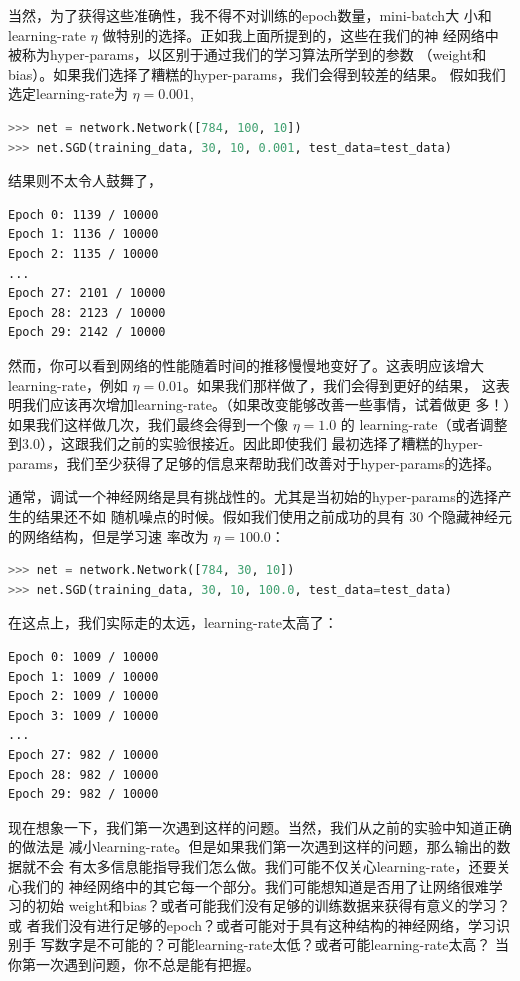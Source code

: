 当然，为了获得这些准确性，我不得不对训练的\gls*{epoch}数量，\gls*{mini-batch}大
小和\gls*{learning-rate} $\eta$ 做特别的选择。正如我上面所提到的，这些在我们的神
经网络中被称为\gls*{hyper-params}，以区别于通过我们的学习算法所学到的参数
（\gls*{weight}和\gls*{bias}）。如果我们选择了糟糕的\gls*{hyper-params}，我们会得到较差的结果。
假如我们选定\gls*{learning-rate}为 $\eta = 0.001$,

\begin{lstlisting}[language=Python]
>>> net = network.Network([784, 100, 10])
>>> net.SGD(training_data, 30, 10, 0.001, test_data=test_data)
\end{lstlisting}

结果则不太令人鼓舞了，

\begin{lstlisting}[language=sh]
Epoch 0: 1139 / 10000
Epoch 1: 1136 / 10000
Epoch 2: 1135 / 10000
...
Epoch 27: 2101 / 10000
Epoch 28: 2123 / 10000
Epoch 29: 2142 / 10000
\end{lstlisting}

然而，你可以看到网络的性能随着时间的推移慢慢地变好了。这表明应该增大
\gls*{learning-rate}，例如 $\eta = 0.01$。如果我们那样做了，我们会得到更好的结果，
这表明我们应该再次增加\gls*{learning-rate}。（如果改变能够改善一些事情，试着做更
  多！）如果我们这样做几次，我们最终会得到一个像 $\eta = 1.0$ 的%
\gls*{learning-rate}（或者调整到$3.0$），这跟我们之前的实验很接近。因此即使我们
最初选择了糟糕的\gls*{hyper-params}，我们至少获得了足够的信息来帮助我们改善对于\gls*{hyper-params}的选择。

通常，调试一个神经网络是具有挑战性的。尤其是当初始的\gls*{hyper-params}的选择产生的结果还不如
随机噪点的时候。假如我们使用之前成功的具有 30 个隐藏神经元的网络结构，但是学习速
率改为 $\eta = 100.0$：

\begin{lstlisting}[language=Python]
>>> net = network.Network([784, 30, 10])
>>> net.SGD(training_data, 30, 10, 100.0, test_data=test_data)
\end{lstlisting}

在这点上，我们实际走的太远，\gls*{learning-rate}太高了：

\begin{lstlisting}[language=sh]
Epoch 0: 1009 / 10000
Epoch 1: 1009 / 10000
Epoch 2: 1009 / 10000
Epoch 3: 1009 / 10000
...
Epoch 27: 982 / 10000
Epoch 28: 982 / 10000
Epoch 29: 982 / 10000
\end{lstlisting}

现在想象一下，我们第一次遇到这样的问题。当然，我们从之前的实验中知道正确的做法是
减小\gls*{learning-rate}。但是如果我们第一次遇到这样的问题，那么输出的数据就不会
有太多信息能指导我们怎么做。我们可能不仅关心\gls*{learning-rate}，还要关心我们的
神经网络中的其它每一个部分。我们可能想知道是否用了让网络很难学习的初始%
\gls*{weight}和\gls*{bias}？或者可能我们没有足够的训练数据来获得有意义的学习？或
者我们没有进行足够的\gls*{epoch}？或者可能对于具有这种结构的神经网络，学习识别手
写数字是不可能的？可能\gls*{learning-rate}太低？或者可能\gls*{learning-rate}太高？
当你第一次遇到问题，你不总是能有把握。

